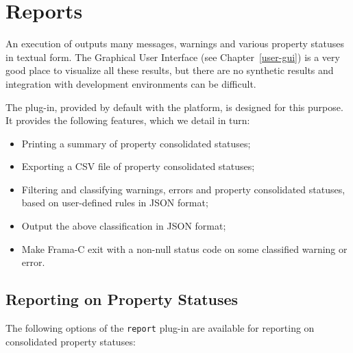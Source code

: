 
\chapter{Reports}
\label{user-report}

An execution of \FramaC outputs many messages, warnings and various property statuses in textual form.
The Graphical User Interface (see Chapter~\ref{user-gui}) is a very good place to visualize all these results,
but there are no synthetic results and integration with development environments can be difficult.

The  plug-in, provided by default with the \FramaC platform, is designed for this purpose.
It provides the following features, which we detail in turn:
\begin{itemize}
\item Printing a summary of property consolidated statuses;
\item Exporting a CSV file of property consolidated statuses;
\item Filtering and classifying warnings, errors and property consolidated statuses, based on user-defined rules in JSON format;
\item Output the above classification in JSON format;
\item Make Frama-C exit with a non-null status code on some classified warning or error.
\end{itemize}


\section{Reporting on Property Statuses}

The following options of the \texttt{report} plug-in are available for reporting on consolidated property statuses:

